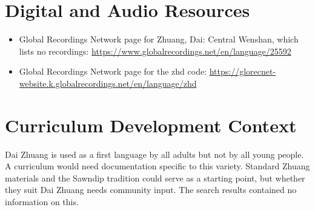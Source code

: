\documentclass[12pt]{article}
\begin{document}
\section{Digital and Audio Resources}
\begin{itemize}
\item Global Recordings Network page for Zhuang, Dai: Central Wenshan, which lists no recordings: \url{https://www.globalrecordings.net/en/language/25592}
\item Global Recordings Network page for the zhd code: \url{https://glorecnet-website.k.globalrecordings.net/en/language/zhd}
\end{itemize}

\section{Curriculum Development Context}
Dai Zhuang is used as a first language by all adults but not by all young people. A curriculum would need documentation specific to this variety. Standard Zhuang materials and the Sawndip tradition could serve as a starting point, but whether they suit Dai Zhuang needs community input. The search results contained no information on this.
\end{document}
